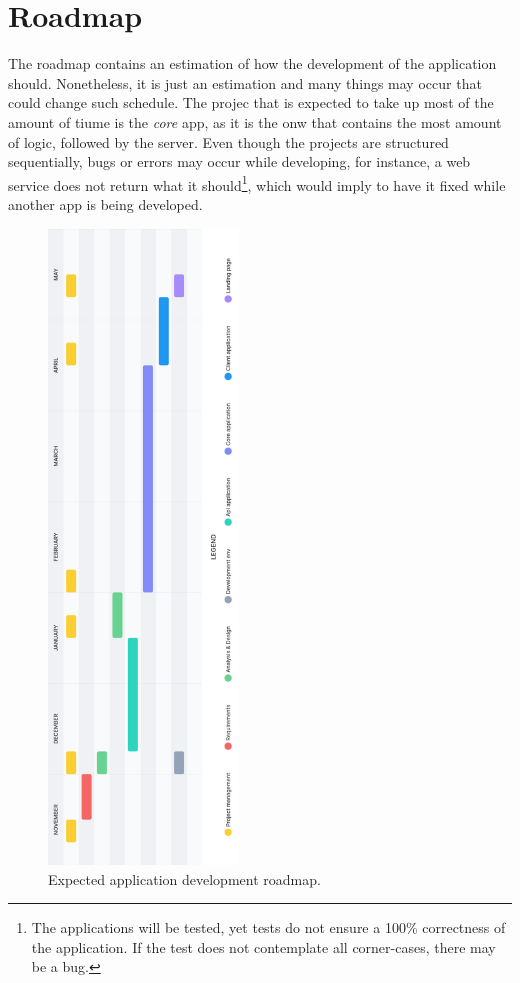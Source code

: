 \documentclass[a4paper, 12pt, oneside]{book}
\begin{document}
\section{Roadmap}
The roadmap contains an estimation of how the development of the application should. Nonetheless, it is just an estimation and many things may occur that could change such schedule. The projec that is expected to take up most of the amount of tiume is the \emph{core} app, as it is the onw that contains the most amount of logic, followed by the server. Even though the projects are structured sequentially, bugs or errors may occur while developing, for instance, a web service does not return what it should\footnote{The applications will be tested, yet tests do not ensure a 100\% correctness of the application. If the test does not contemplate all corner-cases, there may be a bug.}, which would imply to have it fixed while another app is being developed.
\newpage
\begin{figure}[H]
	\centering
	\includegraphics[width=0.45\textwidth]{assets/roadmap.png}
	\caption{Expected application development roadmap.}
\end{figure}
\end{document}
